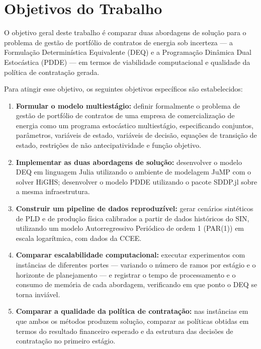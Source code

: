 \section{Objetivos do Trabalho}
\label{sec:objetivos}

O objetivo geral deste trabalho é comparar duas abordagens de solução para o problema de gestão de portfólio de contratos de energia sob incerteza --- a Formulação Determinística Equivalente (DEQ) e a Programação Dinâmica Dual Estocástica (PDDE) --- em termos de viabilidade computacional e qualidade da política de contratação gerada.

Para atingir esse objetivo, os seguintes objetivos específicos são estabelecidos:

\begin{enumerate}
  \item \textbf{Formular o modelo multiestágio:} definir formalmente o problema de gestão de portfólio de contratos de uma empresa de comercialização de energia como um programa estocástico multiestágio, especificando conjuntos, parâmetros, variáveis de estado, variáveis de decisão, equações de transição de estado, restrições de não antecipatividade e função objetivo.

  \item \textbf{Implementar as duas abordagens de solução:} desenvolver o modelo DEQ em linguagem Julia utilizando o ambiente de modelagem JuMP com o solver HiGHS; desenvolver o modelo PDDE utilizando o pacote SDDP.jl sobre a mesma infraestrutura.

  \item \textbf{Construir um pipeline de dados reproduzível:} gerar cenários sintéticos de PLD e de produção física calibrados a partir de dados históricos do SIN, utilizando um modelo Autorregressivo Periódico de ordem 1 (PAR(1)) em escala logarítmica, com dados da CCEE.

  \item \textbf{Comparar escalabilidade computacional:} executar experimentos com instâncias de diferentes portes --- variando o número de ramos por estágio e o horizonte de planejamento --- e registrar o tempo de processamento e o consumo de memória de cada abordagem, verificando em que ponto o DEQ se torna inviável.

  \item \textbf{Comparar a qualidade da política de contratação:} nas instâncias em que ambos os métodos produzem solução, comparar as políticas obtidas em termos do resultado financeiro esperado e da estrutura das decisões de contratação no primeiro estágio.
\end{enumerate}
